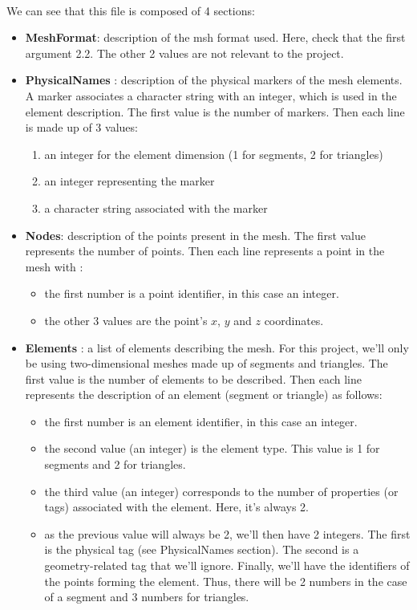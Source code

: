 \documentclass[11pt,a4paper]{article}
\begin{document}
\paragraph{}
We can see that this file is composed of 4 sections:
\begin{itemize}
\item \textbf{MeshFormat}: description of the msh format used. Here, check that the first argument 2.2. The other 2 values are not relevant to the project.
\item \textbf{PhysicalNames} : description of the physical markers of the mesh elements. A marker associates a character string with an integer, which is used in the element description.
  The first value is the number of markers. Then each line is made up of 3 values:
  \begin{enumerate}
  \item an integer for the element dimension (1 for segments, 2 for triangles)
  \item an integer representing the marker
  \item a character string associated with the marker
  \end{enumerate}
\item \textbf{Nodes}: description of the points present in the mesh. The first value represents the number of points.
  Then each line represents a point in the mesh with :
  \begin{itemize}
  \item the first number is a point identifier, in this case an integer.
  \item the other 3 values are the point's $x$, $y$ and $z$ coordinates. 
  \end{itemize}
\item \textbf{Elements} : a list of elements describing the mesh. For this project, we'll only be using two-dimensional meshes made up of segments and triangles.
  The first value is the number of elements to be described. Then each line represents the description of an element (segment or triangle) as follows:
  \begin{itemize}
  \item the first number is an element identifier, in this case an integer.
  \item the second value (an integer) is the element type. This value is 1 for segments and 2 for triangles.
  \item the third value (an integer) corresponds to the number of properties (or tags) associated with the element. Here, it's always 2.
  \item as the previous value will always be 2, we'll then have 2 integers. The first is the physical tag (see PhysicalNames section). The second is a geometry-related tag that we'll ignore.
  Finally, we'll have the identifiers of the points forming the element. Thus, there will be 2 numbers in the case of a segment and 3 numbers for triangles.
  \end{itemize}
\end{itemize}
\end{document}
